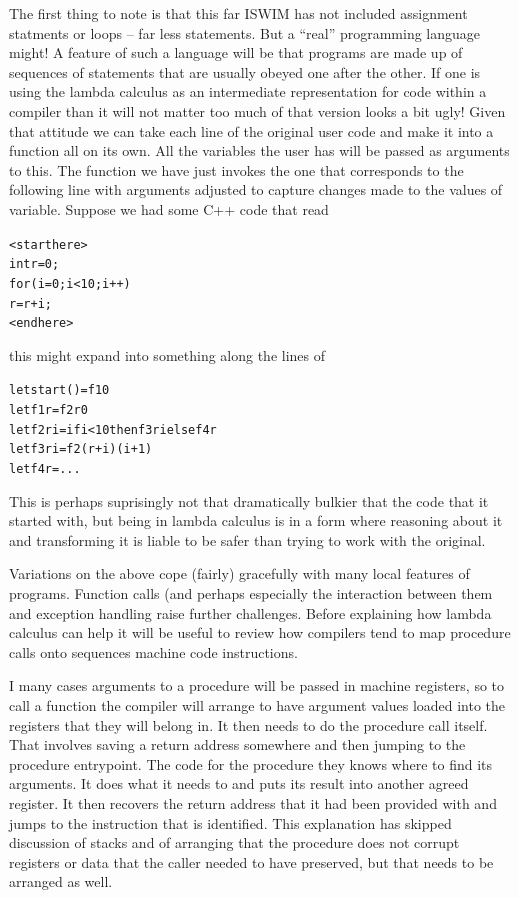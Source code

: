 The first thing to note is that this far ISWIM has not included assignment
statments or \verb@while@ loops -- far less \verb@goto@ statements. But
a ``real'' programming language might! A feature of such a language will
be that programs are made up of sequences of statements that are usually
obeyed one after the other. If one is using the lambda calculus as an
intermediate representation for code within a compiler than it will not
matter too much of that version looks a bit ugly! Given that attitude
we can take each line of the original user code and make it into
a function all on its own. All the variables the user has will be passed
as arguments to this. The function we have just invokes the one
that corresponds to the following line with arguments adjusted to
capture changes made to the values of variable.
Suppose we had some C++ code that read
\begin{alltt}
  <start here>
  int r = 0;
  for (i=0; i<10; i++)
    r = r + i;
  <end here>
\end{alltt}
this might expand into something along the lines of
\begin{alltt}
  let start () = f1 0   %
  let f1 r = f2 r 0     %
  let f2 r i = if i < 10 then f3 r i else f4 r
  let f3 r i = f2 (r+i) (i+1) %
  let f4 r = ...  
\end{alltt}
This is perhaps suprisingly not that dramatically bulkier that the
code that it started with, but being in lambda calculus is in a form
where reasoning about it and transforming it is liable to be safer than
trying to work with the original.

Variations on the above cope (fairly) gracefully with many local features
of programs. Function calls (and perhaps especially the interaction between
them and exception handling raise further challenges. Before explaining how
lambda calculus can help it will be useful to review how compilers tend to
map procedure calls onto sequences machine code instructions.

I many cases arguments to a procedure will be passed in machine registers,
so to call a function the compiler will arrange to have argument
values loaded into the registers that they will belong in. It then needs
to do the procedure call itself. That involves saving a return address
somewhere and then jumping to the procedure entrypoint. The code for the
procedure they knows where to find its arguments. It does what it needs to
and puts its result into another agreed register. It then recovers the
return address that it had been provided with and jumps to the instruction
that is identified. This explanation has skipped discussion of stacks and
of arranging that the procedure does not corrupt registers or data that
the caller needed to have preserved, but that needs to be arranged as well.


